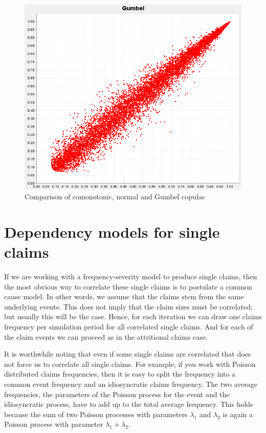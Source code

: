 \begin{figure}
		\includegraphics[scale=0.28]{images/GumbelCopulaSample.png}		
	\caption{Comparison of comonotonic, normal and Gumbel copulas}
	\label{fig:copulaComparison}
\end{figure}



\section{Dependency models for single claims}
\label{sec:depSingle}

If we are working with a frequency-severity model to produce single claims, then the most obvious way to correlate these single claims is to postulate a common cause model. In other words, we assume that the claims stem from the same underlying events. This does not imply that the claim sizes must be correlated; but usually this will be the case. Hence, for each iteration we can draw one claims frequency per simulation period for all correlated single claims. And for each of the claim events we can proceed as in the attritional claims case.

It is worthwhile noting that even if some single claims are correlated that does not force us to correlate all single claims. For example, if you work with Poisson distributed claims frequencies, then it is easy to split the frequency into a common event frequency and an idiosyncratic claims frequency. The two average frequencies, the parameters of the Poisson process for the event and the idiosyncratic process, have to add up to the total average frequency. This holds because the sum of two Poisson processes with parameters $\lambda_1$ and $\lambda_2$ is again a Poisson process with parameter $\lambda_1 + \lambda_2$.

